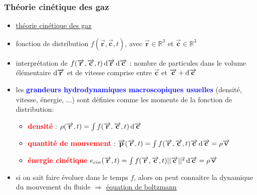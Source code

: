 \documentclass[utf8,usenames,dvipsnames,hyperref={pdfpagemode=FullScreen,urlcolor=blue}]{beamer}
\newcommand\myhref[2]{\textcolor{purple}{\underline{\href{#1}{#2}}}}
\begin{document}
\begin{frame}
  \frametitle{Théorie cinétique des gaz}

  \begin{itemize}
  \item \myhref{https://fr.wikipedia.org/wiki/Th\%C3\%A9orie_cin\%C3\%A9tique_des_gaz}{théorie cinétique des gaz}
  \item fonction de distribution $f(\overrightarrow{\mathbf{r}},\overrightarrow{\mathbf{c}},t)$, avec $\overrightarrow{\mathbf{r}} \in \mathbb{R}^{3}$ et $\overrightarrow{\mathbf{c}} \in \mathbb{R}^{3}$
  \item interprétation de $f(\overrightarrow{\mathbf{r}},\overrightarrow{\mathbf{c}},t) \dif \overrightarrow{\mathbf{r}} \dif \overrightarrow{\mathbf{c}}$ : nombre de particules dans le volume élémentaire $\dif \overrightarrow{\mathbf{r}}$ et de vitesse comprise entre $\overrightarrow{\mathbf{c}}$ et $\overrightarrow{\mathbf{c}} + \dif \overrightarrow{\mathbf{c}}$
  \item les \textcolor{blue}{\bf grandeurs hydrodynamiques macroscopiques usuelles} (densité, vitesse, énergie, ...) sont définies comme les moments de la fonction de distribution:\\
    \begin{itemize}
    \item \textcolor{red}{\bf densité} : $\rho(\overrightarrow{\mathbf{r}},t) = \int f(\overrightarrow{\mathbf{r}},\overrightarrow{\mathbf{c}},t) \dif \overrightarrow{\mathbf{c}} $
    \item \textcolor{red}{\bf quantité de mouvement} : $\overrightarrow{\mathbf{p}}(\overrightarrow{\mathbf{r}},t) = \int f(\overrightarrow{\mathbf{r}},\overrightarrow{\mathbf{c}},t) \overrightarrow{\mathbf{c}} \dif \overrightarrow{\mathbf{c}} = \rho \overrightarrow{\mathbf{v}}$
    \item \textcolor{red}{\bf énergie cinétique} $e_{{cin}}(\overrightarrow{\mathbf{r}},t) = \int f(\overrightarrow{\mathbf{r}},\overrightarrow{\mathbf{c}},t) ||\overrightarrow{\mathbf{c}}||^{2} \dif \overrightarrow{\mathbf{c}} = \rho \overrightarrow{\mathbf{v}}$
    \end{itemize}
  \item si on sait faire évoluer dans le temps $f$, alors on peut connaitre la dynamique du mouvement du fluide $\Rightarrow$ \myhref{https://en.wikipedia.org/wiki/Boltzmann_equation}{équation de boltzmann}
  \end{itemize}

\end{frame}
\end{document}
